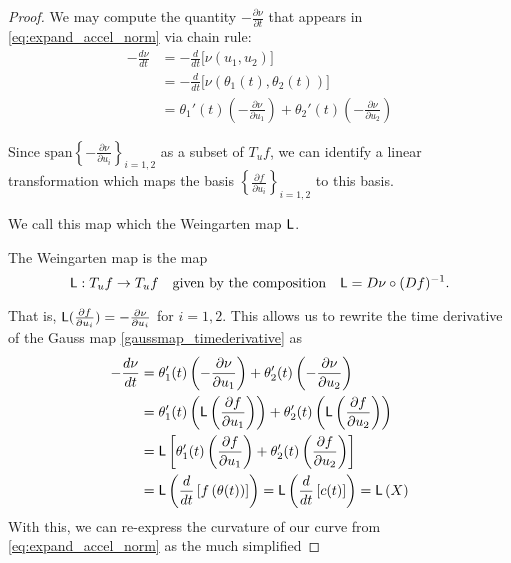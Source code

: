 \begin{proof}
  We may compute the quantity $-\frac{\partial \nu}{\partial t}$ that appears in
	\cref{eq:expand_accel_norm} via chain rule:
	\begin{align} \label{gaussmap_timederivative}
	-\frac{d \nu}{dt} &= -\frac{d}{dt}\big[\nu(u_1, u_2)\big] \nonumber \\
	&= -\frac{d}{dt}\big[\nu(\theta_1(t), \theta_2(t))\big] \nonumber \\
	&= \theta_1'(t)\left( - \frac{\partial \nu}{\partial u_1} \right) + 
	\theta_2'(t)\left( - \frac{\partial \nu}{\partial u_2} \right)
	\end{align}
	
	
	Since $\textrm{span}\left\{ - \frac{\partial \nu}{\partial u_i}\right\}_{i=1,2}$ as a subset of $T_u f$,  we can identify a linear transformation which maps the basis
	$\left\{ \frac{\partial f}{\partial u_i}\right\}_{i=1,2}$ to this basis.
  
  We call this map which the Weingarten map $\mathsf{L}$.
	
	\begin{defn} The Weingarten map is the map \label{def:wein-map}
		\[
		\mathsf{L}: T_u f \to T_u f 
		\quad \textrm{given by the composition} \quad
		\mathsf{L} = D\nu \circ (Df)^{-1}.
		\]
	\end{defn}
	That is, $\mathsf{L}(\frac{\partial f}{\partial u_i}) = - \frac{\partial \nu}{\partial u_i} $ for $i=1,2$.
  This allows us to rewrite the time derivative of the Gauss map \cref{gaussmap_timederivative} as
		\begin{align}
		-\frac{d \nu}{dt} &= 
		\theta_1'(t)\left( - \frac{\partial \nu}{\partial u_1} \right) + 
		\theta_2'(t)\left( - \frac{\partial \nu}{\partial u_2} \right) \nonumber\\
		&= \theta_1'(t)\left( \mathsf{L}\left(\frac{\partial f}{\partial u_1}\right) \right) + 
		\theta_2'(t)\left( \mathsf{L}\left(\frac{\partial f}{\partial u_2}\right) \right)\nonumber \\
		&= \mathsf{L}\left[\theta_1'(t)\left( \frac{\partial f}{\partial u_1}\right)  + 
		\theta_2'(t)\left( \frac{\partial f}{\partial u_2} \right)\right] \nonumber\\
		&= \mathsf{L}\left(\frac{d}{dt}\left[ f\left(\theta(t)\right)\right] \right)
		= \mathsf{L}\left( \frac{d}{dt} \left[ c(t) \right] \right) = \mathsf{L}\left(X\right)
		\end{align} 
		With this, we can re-express the curvature of our curve from
		\cref{eq:expand_accel_norm} as the much simplified
		

\end{proof}
